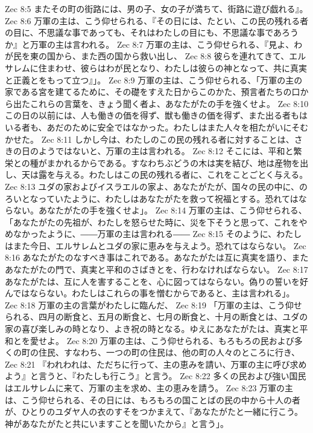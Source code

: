 Zec 8:5  またその町の街路には、男の子、女の子が満ちて、街路に遊び戯れる』。
Zec 8:6  万軍の主は、こう仰せられる、『その日には、たとい、この民の残れる者の目に、不思議な事であっても、それはわたしの目にも、不思議な事であろうか』と万軍の主は言われる。
Zec 8:7  万軍の主は、こう仰せられる、『見よ、わが民を東の国から、また西の国から救い出し、
Zec 8:8  彼らを連れてきて、エルサレムに住まわせ、彼らはわが民となり、わたしは彼らの神となって、共に真実と正義とをもって立つ』」。
Zec 8:9  万軍の主は、こう仰せられる、「万軍の主の家である宮を建てるために、その礎をすえた日からこのかた、預言者たちの口から出たこれらの言葉を、きょう聞く者よ、あなたがたの手を強くせよ。
Zec 8:10  この日の以前には、人も働きの価を得ず、獣も働きの価を得ず、また出る者もはいる者も、あだのために安全ではなかった。わたしはまた人々を相たがいにそむかせた。
Zec 8:11  しかし今は、わたしのこの民の残れる者に対することは、さきの日のようではないと、万軍の主は言われる。
Zec 8:12  そこには、平和と繁栄との種がまかれるからである。すなわちぶどうの木は実を結び、地は産物を出し、天は露を与える。わたしはこの民の残れる者に、これをことごとく与える。
Zec 8:13  ユダの家およびイスラエルの家よ、あなたがたが、国々の民の中に、のろいとなっていたように、わたしはあなたがたを救って祝福とする。恐れてはならない。あなたがたの手を強くせよ」。
Zec 8:14  万軍の主は、こう仰せられる、「あなたがたの先祖が、わたしを怒らせた時に、災を下そうと思って、これをやめなかったように、――万軍の主は言われる――
Zec 8:15  そのように、わたしはまた今日、エルサレムとユダの家に恵みを与えよう。恐れてはならない。
Zec 8:16  あなたがたのなすべき事はこれである。あなたがたは互に真実を語り、またあなたがたの門で、真実と平和のさばきとを、行わなければならない。
Zec 8:17  あなたがたは、互に人を害することを、心に図ってはならない。偽りの誓いを好んではならない。わたしはこれらの事を憎むからであると、主は言われる」。
Zec 8:18  万軍の主の言葉がわたしに臨んだ、
Zec 8:19  「万軍の主は、こう仰せられる、四月の断食と、五月の断食と、七月の断食と、十月の断食とは、ユダの家の喜び楽しみの時となり、よき祝の時となる。ゆえにあなたがたは、真実と平和とを愛せよ。
Zec 8:20  万軍の主は、こう仰せられる、もろもろの民および多くの町の住民、すなわち、一つの町の住民は、他の町の人々のところに行き、
Zec 8:21  『われわれは、ただちに行って、主の恵みを請い、万軍の主に呼び求めよう』と言うと、『わたしも行こう』と言う。
Zec 8:22  多くの民および強い国民はエルサレムに来て、万軍の主を求め、主の恵みを請う。
Zec 8:23  万軍の主は、こう仰せられる、その日には、もろもろの国ことばの民の中から十人の者が、ひとりのユダヤ人の衣のすそをつかまえて、『あなたがたと一緒に行こう。神があなたがたと共にいますことを聞いたから』と言う」。
